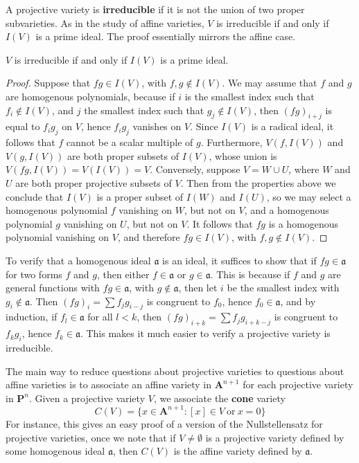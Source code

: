 A projective variety is {\bf irreducible} if it is not the union of two proper subvarieties. As in the study of affine varieties, $V$ is irreducible if and only if $I(V)$ is a prime ideal. The proof essentially mirrors the affine case.

\begin{theorem}
    $V$ is irreducible if and only if $I(V)$ is a prime ideal.
\end{theorem}
\begin{proof}
    Suppose that $fg \in I(V)$, with $f,g \not \in I(V)$. We may assume that $f$ and $g$ are homogenous polynomials, because if $i$ is the smallest index such that $f_i \not \in I(V)$, and $j$ the smallest index such that $g_j \not \in I(V)$, then $(fg)_{i + j}$ is equal to $f_ig_j$ on $V$, hence $f_ig_j$ vanishes on $V$. Since $I(V)$ is a radical ideal, it follows that $f$ cannot be a scalar multiple of $g$. Furthermore, $V(f,I(V))$ and $V(g,I(V))$ are both proper subsets of $I(V)$, whose union is $V(fg,I(V)) = V(I(V)) = V$. Conversely, suppose $V = W \cup U$, where $W$ and $U$ are both proper projective subsets of $V$. Then from the properties above we conclude that $I(V)$ is a proper subset of $I(W)$ and $I(U)$, so we may select a homogenous polynomial $f$ vanishing on $W$, but not on $V$, and a homogenous polynomial $g$ vanishing on $U$, but not on $V$. It follows that $fg$ is a homogenous polynomial vanishing on $V$, and therefore $fg \in I(V)$, with $f,g \not \in I(V)$.
\end{proof}

To verify that a homogenous ideal $\mathfrak{a}$ is an ideal, it suffices to show that if $fg \in \mathfrak{a}$ for two forms $f$ and $g$, then either $f \in \mathfrak{a}$ or $g \in \mathfrak{a}$. This is because if $f$ and $g$ are general functions with $fg \in \mathfrak{a}$, with $g \not \in \mathfrak{a}$, then let $i$ be the smallest index with $g_i \not \in \mathfrak{a}$. Then $(fg)_i = \sum f_jg_{i-j}$ is congruent to $f_0$, hence $f_0 \in \mathfrak{a}$, and by induction, if $f_l \in \mathfrak{a}$ for all $l < k$, then $(fg)_{i+k} = \sum f_jg_{i+k-j}$ is congruent to $f_kg_i$, hence $f_k \in \mathfrak{a}$. This makes it much easier to verify a projective variety is irreducible.

The main way to reduce questions about projective varieties to questions about affine varieties is to associate an affine variety in $\mathbf{A}^{n+1}$ for each projective variety in $\mathbf{P}^n$. Given a projective variety $V$, we associate the {\bf cone} variety
%
\[ C(V) = \{ x \in \mathbf{A}^{n+1}: [x] \in V\ \text{or}\ x = 0 \} \]
%
For instance, this gives an easy proof of a version of the Nullstellensatz for projective varieties, once we note that if $V \neq \emptyset$ is a projective variety defined by some homogenous ideal $\mathfrak{a}$, then $C(V)$ is the affine variety defined by $\mathfrak{a}$.

